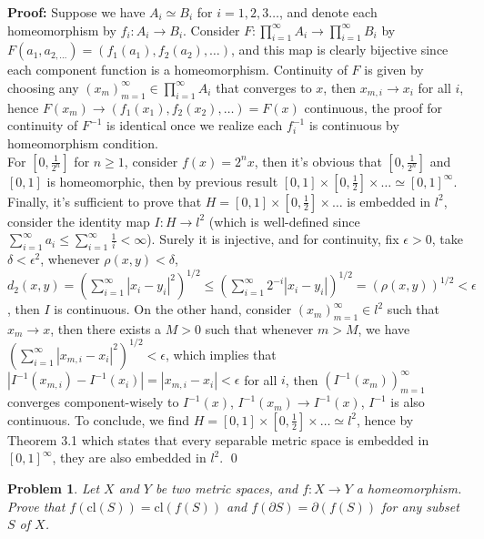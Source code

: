 \documentclass[12pt]{article}
\newtheorem{problem}{Problem}
\begin{document}
\textbf{Proof:} Suppose we have $A_{i}\simeq B_{i}$ for $i=1, 2, 3\dots$, and denote each homeomorphism by $f_{i}: A_{i}\to B_{i}$. Consider $F: \prod\limits_{i=1}^{\infty}A_{i}\to \prod\limits_{i=1}^{\infty}B_{i}$ by $F(a_{1}, a_{2, \dots})=(f_{1}(a_{1}), f_{2}(a_{2}),\dots)$, and this map is clearly bijective since each component function is a homeomorphism. Continuity of $F$ is given by choosing any $(x_{m})_{m=1}^{\infty}\in \prod\limits_{i=1}^{\infty}A_{i}$ that converges to $x$, then $x_{m,i}\to x_{i}$ for all $i$, hence $F(x_{m})\to (f_{1}(x_{1}), f_{2}(x_{2}), \dots)=F(x)$ continuous, the proof for continuity of $F^{-1}$ is identical once we realize each $f^{-1}_{i}$ is continuous by homeomorphism condition. \\
\indent For $[0, \frac{1}{2^n}]$ for $n\geq 1$, consider $f(x)=2^{n}x$, then it's obvious that $[0, \frac{1}{2^n}]$ and $[0, 1]$ is homeomorphic, then by previous result $[0, 1]\times [0,\frac{1}{2}]\times\dots\simeq[0, 1]^{\infty}$. Finally, it's sufficient to prove that $H=[0, 1]\times [0, \frac{1}{2}]\times\dots$ is embedded in $l^{2}$, consider the identity map $I: H\to l^{2}$ (which is well-defined since $\sum\limits_{i=1}^{\infty}a_{i}\leq \sum\limits_{i=1}^{\infty}\frac{1}{i}<\infty$). Surely it is injective, and for continuity, fix $\epsilon >0$, take $\delta<\epsilon^2$, whenever $\rho(x,y)<\delta$, $d_{2}(x,y)=\left( \sum\limits_{i=1}^{\infty}|x_{i}-y_{i}|^2\right)^{1/2}\leq\left(\sum\limits_{i=1}^{\infty}2^{-i}|x_{i}-y_{i}|\right)^{1/2}=(\rho(x,y))^{1/2}<\epsilon$, then $I$ is continuous. On the other hand, consider $(x_{m})_{m=1}^{\infty}\in l^{2}$ such that $x_{m}\to x$, then there exists a $M>0$ such that whenever $m > M$, we have $\left(\sum\limits_{i=1}^{\infty}|x_{m,i}-x_{i}|^{2}\right)^{1/2}<\epsilon$, which implies that $|I^{-1}(x_{m,i})-I^{-1}(x_{i})|=|x_{m, i}-x_{i}|<\epsilon$ for all $i$, then $(I^{-1}(x_{m}))_{m=1}^{\infty}$ converges component-wisely to $I^{-1}(x)$, $I^{-1}(x_{m})\to I^{-1}(x)$, $I^{-1}$ is also continuous. To conclude, we find $H=[0, 1]\times [0, \frac{1}{2}]\times\dots\simeq l^{2}$, hence by Theorem 3.1 which states that every separable metric space is embedded in $[0,1]^{\infty}$, they are also embedded in $l^{2}$. \qed
\\
\begin{problem}
Let $X$ and $Y$ be two metric spaces, and $f: X\to Y$ a homeomorphism. Prove that $f(\text{cl}(S))=\text{cl}(f(S))$ and $f(\partial S)=\partial(f(S))$ for any subset $S$ of $X$.
\end{problem}
\end{document}
